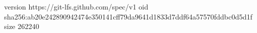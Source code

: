 version https://git-lfs.github.com/spec/v1
oid sha256:ab20e242890942474e350141cff79da9641d1833d7ddf64a57570fddbc0d5d1f
size 262240
